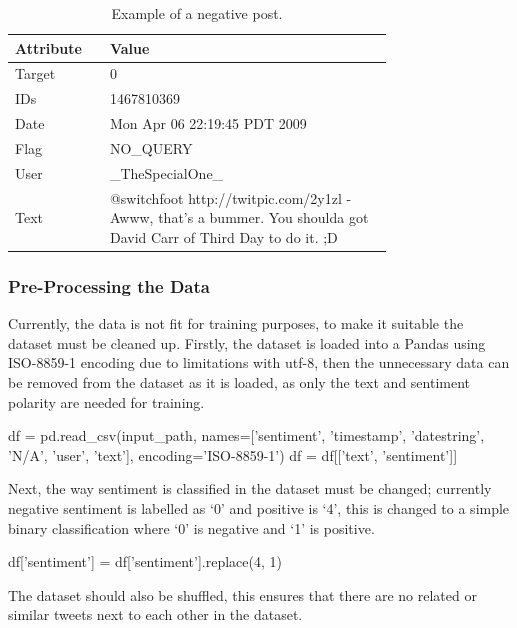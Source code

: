         \begin{table}[h]
            \centering
            \caption{Example of a negative post.}
            \label{tbl:negative_post}
            \begin{tabular}{p{0.15\linewidth} | p{0.6\linewidth}}
                Attribute & Value \\
                \hline\hline
                Target & 0 \\
                IDs & 1467810369 \\
                Date & Mon Apr 06 22:19:45 PDT 2009 \\
                Flag & NO\_QUERY \\
                User & \_TheSpecialOne\_ \\
                Text & @switchfoot http://twitpic.com/2y1zl - Awww, that's a bummer.  You shoulda got David Carr of Third Day to do it. ;D \\
            \end{tabular}
        \end{table}
        \FloatBarrier

        \subsubsection{Pre-Processing the Data}
        Currently, the data is not fit for training purposes, to make it suitable the dataset must be cleaned up. Firstly, the dataset is loaded into a Pandas  using ISO-8859-1 encoding due to limitations with utf-8, then the unnecessary data can be removed from the dataset as it is loaded, as only the text and sentiment polarity are needed for training.

        \begin{python}
df = pd.read_csv(input_path, names=['sentiment', 'timestamp', 'datestring', 'N/A', 'user', 'text'], encoding='ISO-8859-1')
df = df[['text', 'sentiment']]
        \end{python}

        Next, the way sentiment is classified in the dataset must be changed; currently negative sentiment is labelled as `0' and positive is `4', this is changed to a simple binary classification where `0' is negative and `1' is positive.

        \begin{python}
df['sentiment'] = df['sentiment'].replace(4, 1)
        \end{python}

        The dataset should also be shuffled, this ensures that there are no related or similar tweets next to each other in the dataset.

